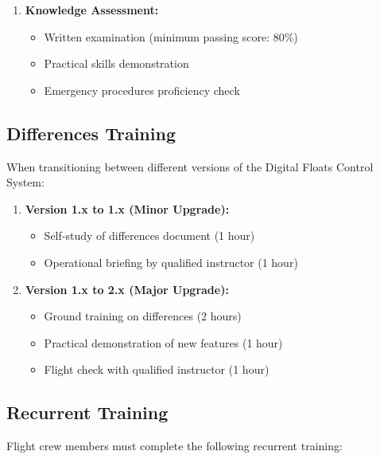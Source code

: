 \documentclass[12pt,a4paper,twoside,openright]{book}
\begin{document}
\begin{enumerate}
    \item \textbf{Knowledge Assessment:}
    \begin{itemize}
        \item Written examination (minimum passing score: 80\%)
        \item Practical skills demonstration
        \item Emergency procedures proficiency check
    \end{itemize}
\end{enumerate}

\subsection{Differences Training}

When transitioning between different versions of the Digital Floats Control System:

\begin{enumerate}
    \item \textbf{Version 1.x to 1.x (Minor Upgrade):}
    \begin{itemize}
        \item Self-study of differences document (1 hour)
        \item Operational briefing by qualified instructor (1 hour)
    \end{itemize}
    
    \item \textbf{Version 1.x to 2.x (Major Upgrade):}
    \begin{itemize}
        \item Ground training on differences (2 hours)
        \item Practical demonstration of new features (1 hour)
        \item Flight check with qualified instructor (1 hour)
    \end{itemize}
\end{enumerate}

\subsection{Recurrent Training}

Flight crew members must complete the following recurrent training:
\end{document}
